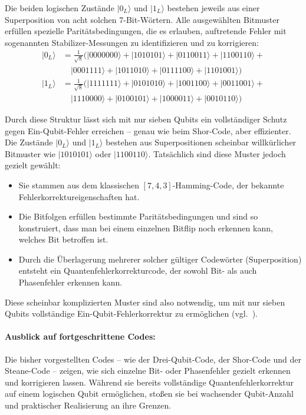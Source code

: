 Die beiden logischen Zustände \(|0_L\rangle\) und \(|1_L\rangle\) bestehen jeweils aus einer Superposition von acht solchen 7-Bit-Wörtern. Alle ausgewählten Bitmuster erfüllen spezielle Paritätsbedingungen, die es erlauben, auftretende Fehler mit sogenannten Stabilizer-Messungen zu identifizieren und zu korrigieren:
\[
\begin{aligned}
|0_L\rangle &= \frac{1}{\sqrt{8}} \big( 
|0000000\rangle + |1010101\rangle + |0110011\rangle + |1100110\rangle + {} \\
&\quad |0001111\rangle + |1011010\rangle + |0111100\rangle + |1101001\rangle \big) \\
|1_L\rangle &= \frac{1}{\sqrt{8}} \big( 
|1111111\rangle + |0101010\rangle + |1001100\rangle + |0011001\rangle + {} \\
&\quad |1110000\rangle + |0100101\rangle + |1000011\rangle + |0010110\rangle \big)
\end{aligned}
\]

Durch diese Struktur lässt sich mit nur sieben Qubits ein vollständiger Schutz gegen Ein-Qubit-Fehler erreichen – genau wie beim Shor-Code, aber effizienter.
Die Zustände \(|0_L\rangle\) und \(|1_L\rangle\) bestehen aus Superpositionen scheinbar willkürlicher Bitmuster wie \(|1010101\rangle\) oder \(|1100110\rangle\). Tatsächlich sind diese Muster jedoch gezielt gewählt:

\begin{itemize}
  \item Sie stammen aus dem klassischen \([7,4,3]\)-Hamming-Code, der bekannte Fehlerkorrektureigenschaften hat.
  \item Die Bitfolgen erfüllen bestimmte Paritätsbedingungen und sind so konstruiert, dass man bei einem einzelnen Bitflip noch erkennen kann, welches Bit betroffen ist.
  \item Durch die Überlagerung mehrerer solcher gültiger Codewörter (Superposition) entsteht ein Quantenfehlerkorrekturcode, der sowohl Bit- als auch Phasenfehler erkennen kann.
\end{itemize}
Diese scheinbar komplizierten Muster sind also notwendig, um mit nur sieben Qubits vollständige Ein-Qubit-Fehlerkorrektur zu ermöglichen (vgl.~\cite[12]{devitt_quantum_2013}).

\paragraph{Ausblick auf fortgeschrittene Codes:}

Die bisher vorgestellten Codes – wie der Drei-Qubit-Code, der Shor-Code und der Steane-Code – zeigen, wie sich einzelne Bit- oder Phasenfehler gezielt erkennen und korrigieren lassen. Während sie bereits vollständige Quantenfehlerkorrektur auf einem logischen Qubit ermöglichen, stoßen sie bei wachsender Qubit-Anzahl und praktischer Realisierung an ihre Grenzen.

